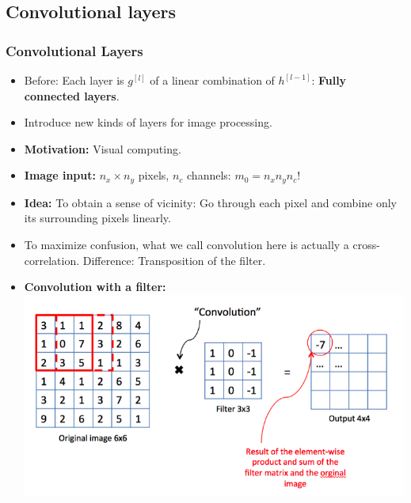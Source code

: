 \documentclass[10pt,hyperref={pdfpagelabels=false}]{beamer}
\begin{document}
\subsection{Convolutional layers}
\begin{frame}[allowframebreaks]
    \frametitle{Convolutional Layers}
    \begin{itemize}
        \item Before: Each layer is $g^{[l]}$ of a linear combination of $h^{[l-1]}$: {\bf Fully connected layers}.
        \item Introduce new kinds of layers for image processing.
        \item {\bf Motivation:} Visual computing.
        \item {\bf Image input:} $n_x \times n_y$ pixels, $n_c$ channels: $m_0=n_xn_yn_c$!
        \item {\bf Idea:} To obtain a sense of vicinity: Go through each pixel and combine only its surrounding pixels linearly.
        \item To maximize confusion, what we call convolution here is actually a cross-correlation. Difference: Transposition of the filter.
        \framebreak
        \item {\bf Convolution with a filter:}\\

        \includegraphics[width=.8\textwidth]{figures/convlayer.png}


\end{itemize}
\end{frame}
\end{document}

